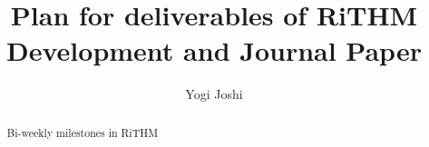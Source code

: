 \documentclass[]{report}
\title{ Plan for deliverables of \textbf{RiTHM} Development and Journal Paper}
\author{Yogi Joshi}
\begin{document}
\maketitle

\begin{abstract}
Bi-weekly milestones in RiTHM 
\end{abstract}
\end{document}
